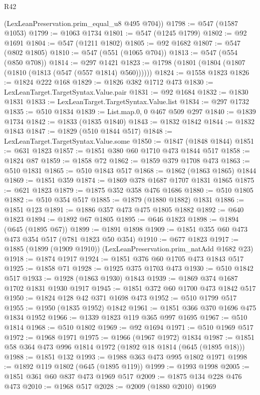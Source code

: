 \begin{lexlean}{R42}
\begin{coremodule}
{{{{{{{{{{{{{{{{{      (LexLeanPreservation.prim_equal_u8 @495 @704))
@1798 := @547 (@1587 @1053)
@1799 := @1063 @1734
@1801 := @547 (@1245 @1799)
@1802 := @92 @1691
@1804 := @547 (@1211 @1802)
@1805 := @92 @1682
@1807 := @547 (@802 @1805)
@1810 := @547 (@551 (@1065 @704))
@1813 := @547 (@554 (@850 @708))
@1814 := @297 @1421
@1823 := @1798 (@1801 (@1804 (@1807 (@1810 (@1813 (@547 (@557 @1814) @560))))))
@1824 := @1558 @1823
@1826 := @1824 @222 @168
@1829 := @1826 @382 @1712 @473
@1830 := LexLeanTarget.TargetSyntax.Value.pair
@1831 := @92 @1684
@1832 := @1830 @1831
@1833 := LexLeanTarget.TargetSyntax.Value.list
@1834 := @297 @1732
@1835 := @510 @1834
@1839 := List.map.{0, 0} @467 @509 @297
@1840 := @1839 @1734
@1842 := @1833 (@1835 @1840)
@1843 := @1832 @1842
@1844 := @1832 @1843
@1847 := @1829 (@510 @1844 @517)
@1848 := LexLeanTarget.TargetSyntax.Value.some
@1850 := @1847 (@1848 @1844)
@1851 := @631 @1823
@1857 := @1851 @380 @60 @1710 @473 @1844 @517
@1858 := @1824 @87
@1859 := @1858 @72
@1862 := @1859 @379 @1708 @473
@1863 := @510 @1831
@1865 := @510 @1843 @517
@1868 := @1862 (@1863 @1865) @1844
@1869 := @1851 @359
@1874 := @1869 @378 @1687 @1707 @1831 @1865
@1875 := @621 @1823
@1879 := @1875 @352 @358 @476 @1686
@1880 := @510 @1805
@1882 := @510 @354 @517
@1885 := @1879 (@1880 @1882) @1831
@1886 := @1851 @123
@1891 := @1886 @357 @473 @475 @1805 @1882
@1892 := @640 @1823
@1894 := @1892 @67 @1805
@1895 := @646 @1823
@1898 := @1894 (@645 (@1895 @67))
@1899 := @1891 @1898
@1909 := @1851 @355 @60 @473 @473 @354 @517 (@781 @1823 @50 @354)
@1910 := @677 @1823
@1917 := @1885 (@1899 (@1909 @1910)) (LexLeanPreservation.prim_natAdd @1682 @23)
@1918 := @1874 @1917
@1924 := @1851 @376 @60 @1705 @473 @1843 @517
@1925 := @1858 @71
@1928 := @1925 @375 @1703 @473
@1930 := @510 @1842 @517
@1933 := @1928 (@1863 @1930) @1843
@1939 := @1869 @374 @1687 @1702 @1831 @1930 @1917
@1945 := @1851 @372 @60 @1700 @473 @1842 @517
@1950 := @1824 @128 @42 @371 @1698 @473
@1952 := @510 @1799 @517
@1955 := @1950 (@1835 @1952) @1842
@1961 := @1851 @366 @370 @1696 @475 @1834 @1952
@1966 := @1339 @1823 @119 @365 @997 @1695
@1967 := @510 @1814
@1968 := @510 @1802
@1969 := @92 @1694
@1971 := @510 @1969 @517
@1972 := @1968 @1971
@1975 := @1966 (@1967 @1972) @1834
@1987 := @1851 @58 @364 @473 @996 @1814 @1972 (@1892 @18 @1814 (@645 (@1895 @18)))
@1988 := @1851 @132
@1993 := @1988 @363 @473 @995 @1802 @1971
@1998 := @1892 @119 @1802 (@645 (@1895 @119))
@1999 := @1993 @1998
@2005 := @1851 @361 @60 @837 @473 @1969 @517
@2009 := @1875 @134 @228 @476 @473
@2010 := @1968 @517
@2028 := @2009
    (@1880 @2010)
    @1969
}}}}}}}}}}}}}}}}}
\end{coremodule}
\end{lexlean}
